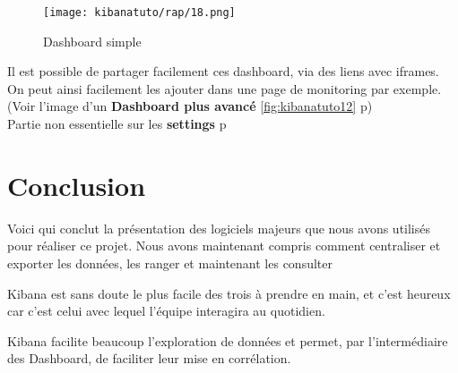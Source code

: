 \begin{figure}[H]
\center
\texttt{[image: kibanatuto/rap/18.png]}
\label{fig:kibanatuto11}
\caption{Dashboard simple}
\end{figure}

Il est possible de partager facilement ces dashboard, via des liens avec 
iframes. On peut ainsi facilement les ajouter dans une page de monitoring par exemple.\\[2mm]
(Voir l'image d'un \textbf{Dashboard plus avancé} \ref{fig:kibanatuto12} p\pageref{fig:kibanatuto12})\\[2mm]
Partie non essentielle sur les \textbf{settings} p\pageref{subsec:settings}

\section{Conclusion}
Voici qui conclut la présentation des logiciels majeurs que nous avons
utilisés pour réaliser ce projet. Nous avons maintenant compris comment
centraliser et exporter les données, les ranger et maintenant les consulter

Kibana est sans doute le plus facile des trois  à prendre en main, et c'est heureux 
car c'est celui avec lequel l'équipe interagira au quotidien.

Kibana facilite beaucoup l'exploration de données et permet, par l'intermédiaire des Dashboard,  de faciliter leur mise en corrélation.
